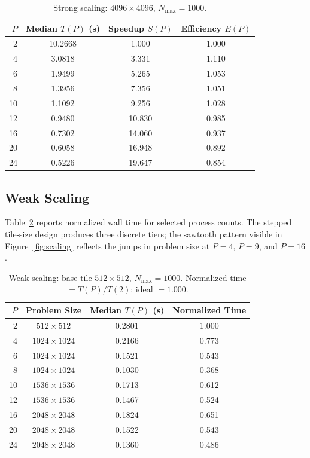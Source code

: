\documentclass[11pt]{article}
\begin{document}
\begin{table}[H]
  \centering
  \caption{Strong scaling: $4096 \times 4096$, $N_{\max} = 1000$.}
  \label{tab:ss_4096}
  \begin{tabular}{rccc}
    \toprule
    \textbf{$P$} & \textbf{Median $T(P)$ (s)} & \textbf{Speedup $S(P)$} & \textbf{Efficiency $E(P)$} \\
    \midrule
    2  & 10.2668 & 1.000  & 1.000 \\
    4  & 3.0818  & 3.331  & 1.110 \\
    6  & 1.9499  & 5.265  & 1.053 \\
    8  & 1.3956  & 7.356  & 1.051 \\
    10 & 1.1092  & 9.256  & 1.028 \\
    12 & 0.9480  & 10.830 & 0.985 \\
    16 & 0.7302  & 14.060 & 0.937 \\
    20 & 0.6058  & 16.948 & 0.892 \\
    24 & 0.5226  & 19.647 & 0.854 \\
    \bottomrule
  \end{tabular}
\end{table}

\subsection{Weak Scaling}

Table~\ref{tab:weak} reports normalized wall time for selected process counts.
The stepped tile-size design produces three discrete tiers; the sawtooth
pattern visible in Figure~\ref{fig:scaling} reflects the jumps in problem size
at $P = 4$, $P = 9$, and $P = 16$.

\begin{table}[H]
  \centering
  \caption{Weak scaling: base tile $512\times512$, $N_{\max}=1000$.
    Normalized time $= T(P)/T(2)$; ideal $= 1.000$.}
  \label{tab:weak}
  \begin{tabular}{rccc}
    \toprule
    \textbf{$P$} & \textbf{Problem Size} & \textbf{Median $T(P)$ (s)} & \textbf{Normalized Time} \\
    \midrule
    2  & $512\times512$    & 0.2801 & 1.000 \\
    4  & $1024\times1024$  & 0.2166 & 0.773 \\
    6  & $1024\times1024$  & 0.1521 & 0.543 \\
    8  & $1024\times1024$  & 0.1030 & 0.368 \\
    10 & $1536\times1536$  & 0.1713 & 0.612 \\
    12 & $1536\times1536$  & 0.1467 & 0.524 \\
    16 & $2048\times2048$  & 0.1824 & 0.651 \\
    20 & $2048\times2048$  & 0.1522 & 0.543 \\
    24 & $2048\times2048$  & 0.1360 & 0.486 \\
    \bottomrule
  \end{tabular}
\end{table}
\end{document}
